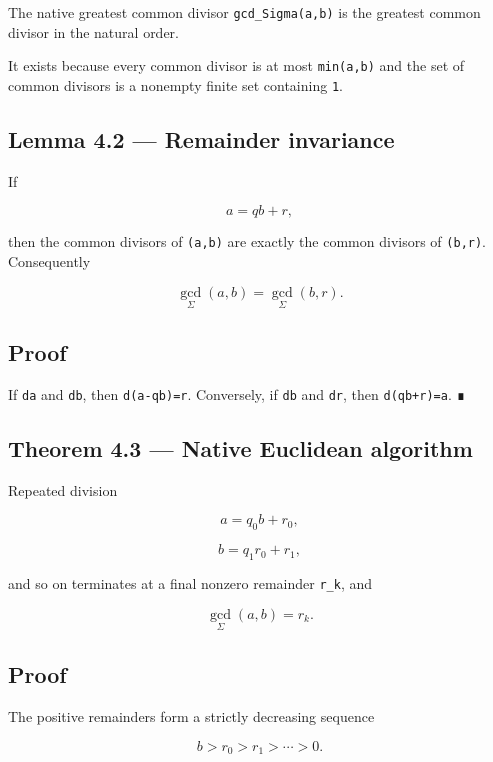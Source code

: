 The native greatest common divisor \texttt{gcd\_Sigma(a,b)} is the greatest common
divisor in the natural order.

It exists because every common divisor is at most \texttt{min(a,b)} and the set of
common divisors is a nonempty finite set containing \texttt{1}.

\hypertarget{lemma-4.2-remainder-invariance}{%
\subsection{Lemma 4.2 --- Remainder invariance}\label{lemma-4.2-remainder-invariance}}

If

\[
a=qb+r,
\]

then the common divisors of \texttt{(a,b)} are exactly the common divisors of \texttt{(b,r)}.
Consequently

\[
\boxed{
\gcd_\Sigma(a,b)=\gcd_\Sigma(b,r).
}
\]

\hypertarget{proof-2}{%
\subsection{Proof}\label{proof-2}}

If \texttt{d\textbar{}a} and \texttt{d\textbar{}b}, then \texttt{d\textbar{}(a-qb)=r}. Conversely, if \texttt{d\textbar{}b} and \texttt{d\textbar{}r}, then
\texttt{d\textbar{}(qb+r)=a}. ∎

\hypertarget{theorem-4.3-native-euclidean-algorithm}{%
\subsection{Theorem 4.3 --- Native Euclidean algorithm}\label{theorem-4.3-native-euclidean-algorithm}}

Repeated division

\[
a=q_0b+r_0,
\]

\[
b=q_1r_0+r_1,
\]

and so on terminates at a final nonzero remainder \texttt{r\_k}, and

\[
\boxed{
\gcd_\Sigma(a,b)=r_k.
}
\]

\hypertarget{proof-3}{%
\subsection{Proof}\label{proof-3}}

The positive remainders form a strictly decreasing sequence

\[
b>r_0>r_1>\cdots>0.
\]

